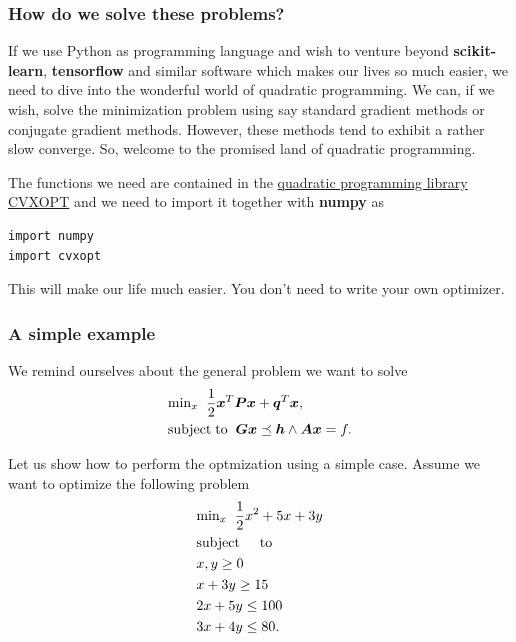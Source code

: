 \documentclass{beamer}
\begin{document}
\begin{frame}
\frametitle{How do we solve these problems?}

If we use Python as programming language and wish to venture beyond
\textbf{scikit-learn}, \textbf{tensorflow} and similar software which makes our
lives so much easier, we need to dive into the wonderful world of
quadratic programming. We can, if we wish, solve the minimization
problem using say standard gradient methods or conjugate gradient
methods. However, these methods tend to exhibit a rather slow
converge. So, welcome to the promised land of quadratic programming.

The functions we need are contained in the \href{{https://cvxopt.org/userguide/coneprog.html}}{quadratic programming library CVXOPT} and we need to import it together with \textbf{numpy} as




\begin{lstlisting}
import numpy
import cvxopt

\end{lstlisting}


This will make our life much easier. You don't need to write your own optimizer.
\end{frame}

\begin{frame}
\frametitle{A simple example}

We remind ourselves about the general problem we want to solve
\begin{align*}
    &\mathrm{min}_{x}\hspace{0.2cm} \frac{1}{2}\bm{x}^T\bm{P}\bm{x}+\bm{q}^T\bm{x},\\ \nonumber
    &\mathrm{subject\hspace{0.1cm} to} \hspace{0.2cm} \bm{G}\bm{x} \preceq \bm{h} \wedge  \bm{A}\bm{x}=f.
\end{align*}

Let us show how to perform the optmization using a simple case. Assume we want to optimize the following problem
\begin{align*}
    &\mathrm{min}_{x}\hspace{0.2cm} \frac{1}{2}x^2+5x+3y \\ \nonumber
    &\mathrm{subject}\hspace{0.5cm} \mathrm{to} \\ \nonumber
    &x, y \geq 0 \\ \nonumber
    &x+3y  \geq 15 \\ \nonumber
    &2x+5y  \leq  100 \\ \nonumber
    &3x+4y  \leq  80.  \\ \nonumber
\end{align*}
\end{frame}
\end{document}

